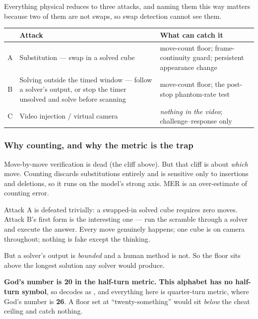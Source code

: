 Everything physical reduces to three attacks, and naming them this way
matters because two of them are not swaps, so swap detection cannot see
them.

\begin{center}\small
\begin{tabular}{@{}clp{7.6cm}@{}}
\toprule
& \textbf{Attack} & \textbf{What can catch it} \\
\midrule
A & Substitution --- swap in a solved cube
  & move-count floor; frame-continuity guard; persistent appearance change \\
B & Solving outside the timed window --- follow a solver's output, or stop
    the timer unsolved and solve before scanning
  & move-count floor; the post-stop phantom-rate test \\
C & Video injection / virtual camera
  & \emph{nothing in the video}; challenge--response only \\
\bottomrule
\end{tabular}
\end{center}

\subsubsection{Why counting, and why the metric is the trap}

Move-by-move verification is dead (the cliff above). But that cliff is about
\emph{which} move. Counting discards substitutions entirely and is sensitive
only to insertions and deletions, so it runs on the model's strong axis. MER
is an over-estimate of counting error.

Attack A is defeated trivially: a swapped-in solved cube requires zero moves.
Attack B's first form is the interesting one --- run the scramble through a
solver and execute the answer. Every move genuinely happens; one cube is on
camera throughout; nothing is fake except the thinking.

But a solver's output is \emph{bounded} and a human method is not. So the
floor sits above the longest solution any solver would produce.

\begin{keybox}
\textbf{God's number is 20 in the half-turn metric. This alphabet has no
half-turn symbol}, so  decodes as , and everything
here is quarter-turn metric, where God's number is \textbf{26}. A floor set
at ``twenty-something'' would sit \emph{below} the cheat ceiling and catch
nothing.
\end{keybox}

